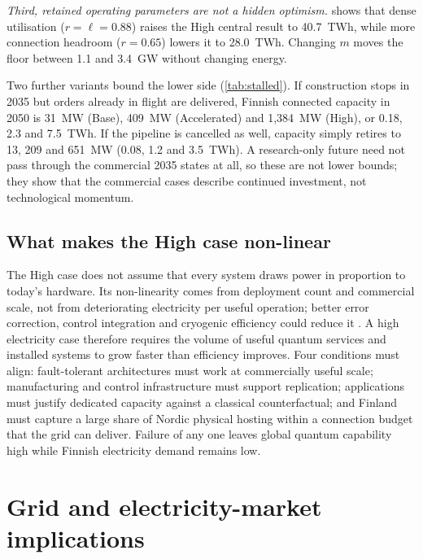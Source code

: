 \documentclass[11pt,a4paper]{article}
\begin{document}
\emph{Third, retained operating parameters are not a hidden optimism.}  shows that dense utilisation ($r=\ell=0.88$) raises the High central result to 40.7~TWh, while more connection headroom ($r=0.65$) lowers it to 28.0~TWh. Changing $m$ moves the floor between 1.1 and 3.4~GW without changing energy.

Two further variants bound the lower side (\cref{tab:stalled}). If construction stops in 2035 but orders already in flight are delivered, Finnish connected capacity in 2050 is 31~MW (Base), 409~MW (Accelerated) and 1,384~MW (High), or 0.18, 2.3 and 7.5~TWh. If the pipeline is cancelled as well, capacity simply retires to 13, 209 and 651~MW (0.08, 1.2 and 3.5~TWh). A research-only future need not pass through the commercial 2035 states at all, so these are not lower bounds; they show that the commercial cases describe continued investment, not technological momentum.

\subsection{What makes the High case non-linear}
The High case does not assume that every system draws power in proportion to today's hardware. Its non-linearity comes from deployment count and commercial scale, not from deteriorating electricity per useful operation; better error correction, control integration and cryogenic efficiency could reduce it \citep{fellous2023optimizing,carrasco2026energy,santos2026spin}. A high electricity case therefore requires the volume of useful quantum services and installed systems to grow faster than efficiency improves. Four conditions must align: fault-tolerant architectures must work at commercially useful scale; manufacturing and control infrastructure must support replication; applications must justify dedicated capacity against a classical counterfactual; and Finland must capture a large share of Nordic physical hosting within a connection budget that the grid can deliver. Failure of any one leaves global quantum capability high while Finnish electricity demand remains low.

\section{Grid and electricity-market implications}
\end{document}
